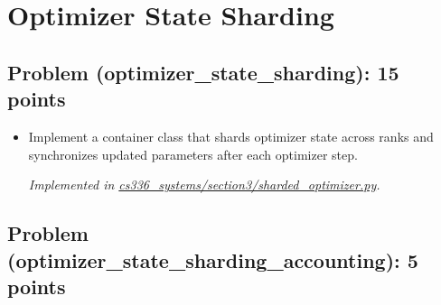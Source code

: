 \documentclass[letterpaper]{article}
\newcommand{\repofile}[2]{\href{https://github.com/echung32/ece405-assignment4-hpc/blob/main/#1}{#2}}
\begin{document}
	\section{Optimizer State Sharding}
	
	\subsection{Problem (optimizer\_state\_sharding): 15 points}
	
	\begin{itemize}
		\item[(a)] Implement a container class that shards optimizer state across ranks and synchronizes updated parameters after each optimizer step.
		
		\textit{Implemented in \repofile{cs336_systems/section3/sharded_optimizer.py}{cs336\_systems/section3/sharded\_optimizer.py}.}
	\end{itemize}
	
	\subsection{Problem (optimizer\_state\_sharding\_accounting): 5 points}
	
\end{document}

